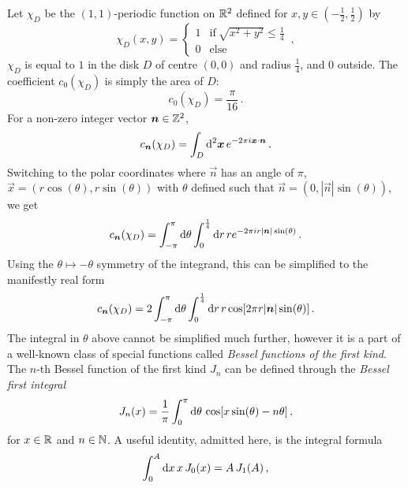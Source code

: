\begin{example}
  \label{ex:disk-indicator}
  Let $\chi_D$ be the $(1,1)$-periodic function on $\mathbb{R}^2$ defined for
  $x,y\in(-\frac12,\frac12)$ by
  \begin{equation}
    \chi_D(x,y)=
    \begin{cases}
      1&\text{if}~\sqrt{x^2+y^2}\leq\frac14\\
      0&\text{else}
    \end{cases}\,,
  \end{equation}
  \ie $\chi_D$ is equal to $1$ in the disk $D$ of centre $(0,0)$ and radius $\frac14$, and
  $0$ outside. The coefficient $c_0(\chi_D)$ is simply the area of $D$:
  \begin{equation}
    c_0(\chi_D)=\frac{\pi}{16}\,.
  \end{equation}
  For a non-zero integer vector $\bm{n}\in\mathbb{Z}^2$,
  \begin{equation}
    c_{\bm{n}}(\chi_D)=\int_{D}\mathrm{d}^2\bm{x}\,e^{-2\pi i\bm{x}\cdotp\bm{n}}\,.
  \end{equation}
  Switching to the polar coordinates where $\vec{n}$ has an angle of $\pi$,~\ie
  $\vec{x}=(r\cos(\theta),r\sin(\theta))$ with $\theta$ defined such that
  $\vec{n}=(0,|\vec{n}|\sin(\theta))$, we get
  \begin{equation}
    c_{\bm{n}}(\chi_D)=\int_{-\pi}^{\pi}\mathrm{d}\theta\int_{0}^{\frac14}\mathrm{d} r\,
    re^{-2\pi ir|\bm{n}|\sin(\theta)}\,.
  \end{equation}
  Using the $\theta\mapsto -\theta$ symmetry of the integrand, this can be simplified to
  the manifestly real form
  \begin{equation}
    c_{\bm{n}}(\chi_D)=2\int_{-\pi}^{\pi}\mathrm{d}\theta\int_{0}^{\frac14}\mathrm{d} r\,
    r\cos[2\pi r|\bm{n}|\sin(\theta)]\,.
  \end{equation}
  The integral in $\theta$ above cannot be simplified much further, however it is a part
  of a well-known class of special functions called \emph{Bessel functions of the first
  kind}. The $n$-th Bessel function of the first kind $J_n$ can be defined through the
  \emph{Bessel first integral}
  \begin{equation}
    J_n(x)=\frac{1}{\pi}\int_0^\pi\mathrm{d}\theta\,\cos[x\sin(\theta)-n\theta]\,,
  \end{equation}
  for $x\in\mathbb{R}$ and $n\in\mathbb{N}$. A useful identity, admitted here, is the integral formula
  \begin{equation}
    \int_0^A\mathrm{d} x\,x\,J_0(x)=A\,J_1(A)\,,
  \end{equation}

\end{example}
